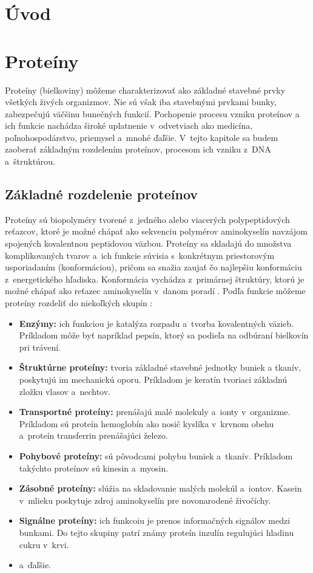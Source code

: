 
\chapter{Úvod}

\chapter{Proteíny}

Proteíny (bielkoviny) môžeme charakterizovať ako základné stavebné prvky všetkých živých organizmov. Nie sú však iba stavebnými prvkami bunky, zabezpečujú väčšinu bunečných funkcií. Pochopenie procesu vzniku proteínov a ich funkcie nachádza široké uplatnenie v~odvetviach ako medicína, poľnohospodárstvo, priemysel a~mnohé ďaľšie. 
V~tejto kapitole sa budem zaoberať základným rozdelením proteínov, procesom ich vzniku z~DNA a~štruktúrou.

\section{Základné rozdelenie proteínov}

Proteíny sú biopolyméry tvorené z~jedného alebo viacerých polypeptidových reťazcov, ktoré je možné chápať ako sekvenciu polymérov aminokyselín navzájom spojených kovalentnou peptidovou väzbou. Proteíny sa skladajú do množstva komplikovaných tvarov a~ich funkcie súvisia s~konkrétnym priestorovým usporiadaním (konformáciou), pričom sa snažia zaujať čo najlepšiu konformáciu z~energetického hľadiska. Konformácia vychádza z~primárnej štruktúry, ktorú je možné chápať ako reťazec aminokyselín v~danom poradí \cite{proteiny}. Podľa funkcie môžeme proteíny rozdeliť do niekoľkých skupín \cite{proteiny}:  
\begin{itemize}
	\item \textbf{Enzýmy:} ich funkciou je katalýza rozpadu a~tvorba kovalentných väzieb. Príkladom môže byť napríklad pepsín, ktorý sa podieľa na odbúraní bielkovín pri trávení.
	\item \textbf{Štruktúrne proteíny:} tvoria základné stavebné jednotky buniek a tkanív, poskytujú im mechanickú oporu. Príkladom je keratín tvoriaci základnú zložku vlasov a~nechtov.
	\item \textbf{Transportné proteíny:} prenášajú malé molekuly a~ionty v~organizme. Príkladom sú proteín hemoglobín ako nosič kyslíka v~krvnom obehu a~proteín transferrin prenášajúci železo.
	\item \textbf{Pohybové proteíny:} sú pôvodcami pohybu buniek a~tkanív. Príkladom takýchto proteínov sú kinesin a~myosin.
	\item \textbf{Zásobné proteíny:} slúžia na skladovanie malých molekúl a~iontov. Kasein v~mlieku poskytuje zdroj aminokyselín pre novonarodené živočíchy. 
	\item \textbf{Signálne proteíny:} ich funkcoiu je prenos informačných signálov medzi bunkami. Do tejto skupiny patrí známy proteín inzulín regulujúci hladinu cukru v~krvi.
	\item a~ďaľšie.
\end{itemize}

